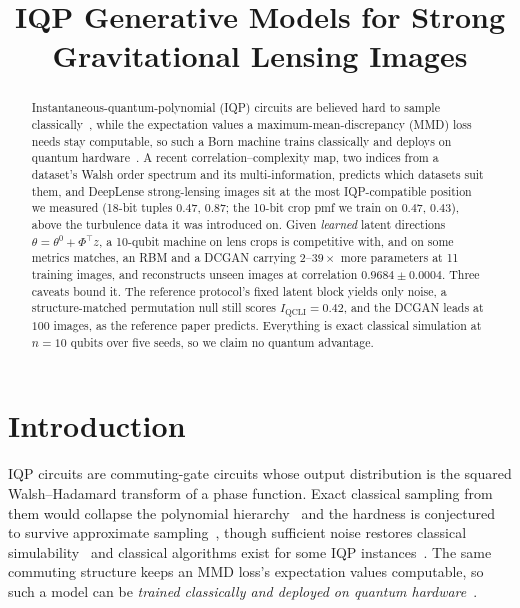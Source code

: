 \documentclass{article}
\title{IQP Generative Models for Strong Gravitational Lensing Images}
\author{}
\newcommand{\qcli}{I_{\mathrm{QCLI}}}
\begin{document}
\maketitle

\begin{abstract}
Instantaneous-quantum-polynomial (IQP) circuits are believed hard to sample
classically~\cite{bremner_2011_classical,bremner_2016_average}, while the expectation values a
maximum-mean-discrepancy (MMD) loss needs stay computable, so such a Born machine trains classically
and deploys on quantum hardware~\cite{recio_2025_train}. A recent correlation--complexity map, two
indices from a dataset's Walsh order spectrum and its multi-information, predicts which datasets suit
them, and DeepLense strong-lensing images sit at the most IQP-compatible position we measured
(18-bit tuples $0.47$, $0.87$; the 10-bit crop pmf we train on $0.47$, $0.43$), above the turbulence
data it was introduced on. Given \emph{learned} latent directions
$\theta = \theta^{0} + \Phi^{\!\top} z$, a 10-qubit machine on lens crops is competitive with, and on
some metrics matches, an RBM and a DCGAN carrying $2$--$39\times$ more parameters at 11
training images, and reconstructs unseen images at correlation $0.9684 \pm 0.0004$. Three caveats
bound it. The reference protocol's fixed latent block yields only noise, a structure-matched
permutation null still scores $\qcli = 0.42$, and the DCGAN leads at $100$ images, as the reference
paper predicts. Everything is exact classical simulation at $n = 10$ qubits over five seeds, so we
claim no quantum advantage.
\end{abstract}

\section{Introduction}
\label{sec:intro}

IQP circuits are commuting-gate circuits whose output distribution is the squared Walsh--Hadamard
transform of a phase function. Exact classical sampling from them would collapse the polynomial
hierarchy~\cite{bremner_2011_classical} and the hardness is conjectured to survive approximate
sampling~\cite{bremner_2016_average}, though sufficient noise restores classical
simulability~\cite{rajakumar_2024_polynomial} and classical algorithms exist for some IQP
instances~\cite{codsi_2025_classically}. The same commuting structure keeps an MMD loss's
expectation values computable, so such a model can be \emph{trained classically and deployed on
quantum hardware}~\cite{recio_2025_train,recio_2025_iqpopt}.
\end{document}
